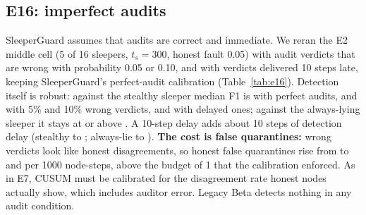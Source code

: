 \subsection{E16: imperfect audits}
SleeperGuard assumes that audits are correct and immediate. We reran the E2 middle cell (5 of 16 sleepers, $t_s=300$,
honest fault 0.05) with audit verdicts that are wrong with probability 0.05 or 0.10, and with verdicts delivered 10
steps late, keeping SleeperGuard's perfect-audit calibration (Table~\ref{tab:e16}). Detection itself is robust: against
the stealthy sleeper median F1 is \EsixteenStealthPerfectSgFOne{} with perfect audits, \EsixteenStealthErrFiveSgFOne{} and
\EsixteenStealthErrTenSgFOne{} with 5\% and 10\% wrong verdicts, and \EsixteenStealthDelaySgFOne{} with delayed ones;
against the always-lying sleeper it stays at or above \EsixteenLieErrTenSgFOne{}. A 10-step delay adds about 10 steps of
detection delay (stealthy \EsixteenStealthPerfectSgDelay{} to \EsixteenStealthDelaySgDelay{}; always-lie
\EsixteenLiePerfectSgDelay{} to \EsixteenLieDelaySgDelay{}). \textbf{The cost is false quarantines:} wrong verdicts look
like honest disagreements, so honest false quarantines rise from \EsixteenStealthPerfectSgFq{} to
\EsixteenStealthErrFiveSgFq{} and \EsixteenStealthErrTenSgFq{} per 1000 node-steps, above the budget of 1 that the
calibration enforced. As in E7, CUSUM must be calibrated for the disagreement rate honest nodes actually show, which
includes auditor error. Legacy Beta detects nothing in any audit condition.

